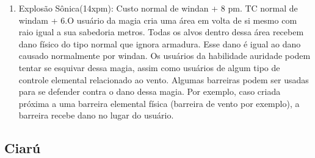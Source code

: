 \begin{enumerate}
\item Explosão Sônica(14xpm): Custo normal de windan + 8 pm. TC normal de windam + 6.\newline O usuário da magia cria uma área em volta de si mesmo com raio igual a sua sabedoria metros. Todas os alvos dentro dessa área recebem dano físico do tipo normal que ignora armadura. Esse dano é igual ao dano causado normalmente por windan. Os usuários da habilidade auridade podem tentar se esquivar dessa magia, assim como usuários de algum tipo de controle elemental relacionado ao vento. Algumas barreiras podem ser usadas para se defender contra o dano dessa magia. Por exemplo, caso criada próxima a uma barreira elemental física (barreira de vento por exemplo), a barreira recebe dano no lugar do usuário. 


\end{enumerate}

\subsection{Ciarú}

